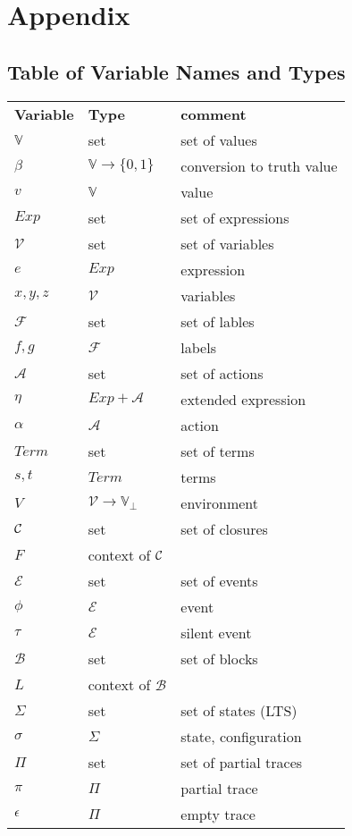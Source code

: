 \documentclass[openright,a4paper,11pt]{scrartcl}
\newcommand{\M}[1]{\ensuremath{\mathit{#1}}}
\newcommand{\set}[1]{\ensuremath{\{#1\}}}
\newcommand{\Exp}{\ensuremath{\M{Exp}}}
\newcommand{\Trm}{\ensuremath{\M{Term}}}
\newcommand{\Fun}{\ensuremath{\mathcal{F}}}
\newcommand{\Act}{\ensuremath{\mathcal{A}}}
\newcommand{\Var}{\ensuremath{\mathcal{V}}}
\newcommand{\Val}{\ensuremath{\mathbb{V}}}
\newcommand{\Valb}{\ensuremath{\mathbb{V}_{\bot}}}
\newcommand{\Evt}{\ensuremath{\mathcal{E}}}
\theoremstyle{plain}
\theoremstyle{plain}
\theoremstyle{plain}
\theoremstyle{plain}
\theoremstyle{nonumberplain}
\begin{document}
\enlargethispage{6mm}



\label{chap:conclusion}
\label{sec:conclusion}


















\section{Appendix}

\subsection{Table of Variable Names and Types}

\begin{tabular}{lll}
\textbf{Variable}&\textbf{Type}&\textbf{comment}\\
$\Val$ & set & set of values\\
$\beta$ & $\Val\to\set{0,1}$ & conversion to truth value\\
$v$ & $\Val$ & value\\
$\Exp$ & set & set of expressions\\
$\Var$ & set & set of variables\\
$e$ & $\Exp$ & expression\\
$x,y,z$ & $\Var$ & variables\\
$\Fun$ & set & set of lables\\
$f,g$ & $\Fun$ & labels\\
$\Act$ & set & set of actions  \\
$\eta$ & $\Exp + \Act$  & extended expression \\
$\alpha$ & $\Act$ & action  \\
$\Trm$ & set & set of terms\\
$s,t$ & $\Trm$ & terms\\
$V$ & $\Var\to\Valb$ & environment\\
$\mathcal{C}$ & set & set of closures\\
$F$ & context of $\mathcal{C}$ &\\
$\Evt$ & set & set of events\\
$\phi$ & $\Evt$ & event\\
$\tau$ & $\Evt$ & silent event\\
$\mathcal{B}$ & set & set of blocks \\
$L$ & context of $\mathcal{B}$ & \\
$\Sigma$ & set & set of states (LTS)\\
$\sigma$ & $\Sigma$ & state, configuration\\
$\Pi$ & set & set of partial traces\\
$\pi$ & $\Pi$ & partial trace \\
$\epsilon$ & $\Pi$ & empty trace\\

\end{tabular}
\end{document}
